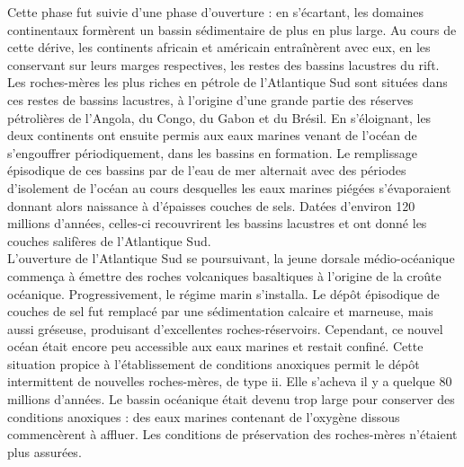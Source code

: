 \documentclass[8pt]{article}
\begin{document}
Cette phase fut suivie d'une phase d'ouverture : en s'écartant, les domaines continentaux formèrent un bassin sédimentaire de plus en plus large. Au cours de cette dérive, les continents africain et américain entraînèrent avec eux, en les conservant sur leurs marges respectives, les restes des bassins lacustres du rift. Les roches-mères les plus riches en pétrole de l'Atlantique Sud sont situées dans ces restes de bassins lacustres, à l'origine d'une grande partie des réserves pétrolières de l'Angola, du Congo, du Gabon et du Brésil. En s'éloignant, les deux continents ont ensuite permis aux eaux marines venant de l'océan de s'engouffrer périodiquement, dans les bassins en formation. Le remplissage épisodique de ces bassins par de l'eau de mer alternait avec des périodes d'isolement de l'océan au cours desquelles les eaux marines piégées s'évaporaient donnant alors naissance à d'épaisses couches de sels. Datées d'environ 120 millions d'années, celles-ci recouvrirent les bassins lacustres et ont donné les couches salifères de l'Atlantique Sud.\\

L'ouverture de l'Atlantique Sud se poursuivant, la jeune dorsale médio-océanique commença à émettre des roches volcaniques basaltiques à l'origine de la croûte océanique. Progressivement, le régime marin s'installa. Le dépôt épisodique de couches de sel fut remplacé par une sédimentation calcaire et marneuse, mais aussi gréseuse, produisant d'excellentes roches-réservoirs. Cependant, ce nouvel océan était encore peu accessible aux eaux marines et restait confiné. Cette situation propice à l'établissement de conditions anoxiques permit le dépôt intermittent de nouvelles roches-mères, de type ii. Elle s'acheva il y a quelque 80 millions d'années. Le bassin océanique était devenu trop large pour conserver des conditions anoxiques : des eaux marines contenant de l'oxygène dissous commencèrent à affluer. Les conditions de préservation des roches-mères n'étaient plus assurées.\\
\end{document}
